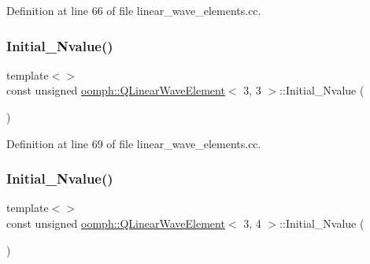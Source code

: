 Definition at line 66 of file linear\+\_\+wave\+\_\+elements.\+cc.

\mbox{\label{classoomph_1_1QLinearWaveElement_a03fcffade80c1fcbde1273e7fcd17dbd}} 
\subsubsection{\texorpdfstring{Initial\+\_\+\+Nvalue()}{Initial\_Nvalue()}\hspace{0.1cm}{\footnotesize\ttfamily [8/9]}}
{\footnotesize\ttfamily template$<$$>$ \\
const unsigned \hyperlink{classoomph_1_1QLinearWaveElement}{oomph\+::\+Q\+Linear\+Wave\+Element}$<$ 3, 3 $>$\+::Initial\+\_\+\+Nvalue (\begin{DoxyParamCaption}{ }\end{DoxyParamCaption})\hspace{0.3cm}{\ttfamily [private]}}



Definition at line 69 of file linear\+\_\+wave\+\_\+elements.\+cc.

\mbox{\label{classoomph_1_1QLinearWaveElement_aafd40bcdd15b55a35ce27ffa454a6b8f}} 
\subsubsection{\texorpdfstring{Initial\+\_\+\+Nvalue()}{Initial\_Nvalue()}\hspace{0.1cm}{\footnotesize\ttfamily [9/9]}}
{\footnotesize\ttfamily template$<$$>$ \\
const unsigned \hyperlink{classoomph_1_1QLinearWaveElement}{oomph\+::\+Q\+Linear\+Wave\+Element}$<$ 3, 4 $>$\+::Initial\+\_\+\+Nvalue (\begin{DoxyParamCaption}{ }\end{DoxyParamCaption})\hspace{0.3cm}{\ttfamily [private]}}



